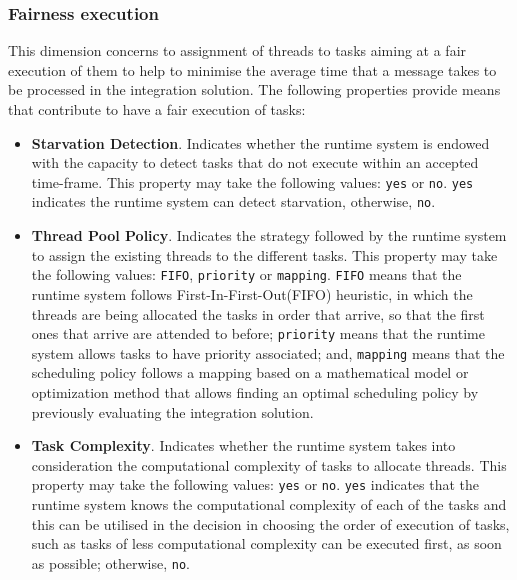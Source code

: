 \subsubsection{{Fairness execution}}
\label{subsubsec:fairness}
\noindent
This dimension concerns to assignment of threads to tasks aiming at a fair execution of them to help to minimise the average time that a message takes to be processed in the integration solution. The following properties provide means that contribute to have a fair execution of tasks:
\begin{itemize}
%	
\item \textbf{Starvation Detection}. Indicates whether the runtime system is endowed with the capacity to detect tasks that do not execute within an accepted time-frame. This property may take the following values: \texttt{yes} or \texttt{no}. \texttt{yes} indicates the runtime system can detect starvation, otherwise, \texttt{no}. 
%	
\item \textbf{Thread Pool Policy}. Indicates the strategy followed by the runtime system to assign the existing threads to the different tasks. This property may take the following values: \texttt{FIFO}, \texttt{priority} or \texttt{mapping}. \texttt{FIFO} means that the runtime system follows First-In-First-Out(FIFO) heuristic, in which the threads are being allocated the tasks in order that arrive, so that the first ones that arrive are attended to before; \texttt{priority} means that the runtime system allows tasks to have priority associated; and, \texttt{mapping} means that the scheduling policy follows a mapping based on a mathematical model or optimization method that allows finding an optimal scheduling policy by previously evaluating the integration solution.
%	
\item \textbf{Task Complexity}. Indicates whether the runtime system takes into consideration the computational complexity of tasks to allocate threads. This property may take the following values: \texttt{yes} or \texttt{no}. \texttt{yes} indicates that the runtime system knows the computational complexity of each of the tasks and this can be utilised in the decision in choosing the order of execution of tasks, such as tasks of less computational complexity can be executed first, as soon as possible; otherwise, \texttt{no}.

\end{itemize}
